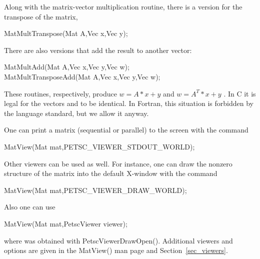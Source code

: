 Along with the matrix-vector multiplication routine, there is
a version for the transpose of the matrix,
\begin{tabbing}
  MatMultTranspose(Mat A,Vec x,Vec y);
\end{tabbing}
There are also versions that add the result
to another vector:
\begin{tabbing}
  MatMultAdd(Mat A,Vec x,Vec y,Vec w);\\
  MatMultTransposeAdd(Mat A,Vec x,Vec y,Vec w);
\end{tabbing}
These routines, respectively, produce $ w = A*x + y $ and $ w = A^{T}*x + y$ .
In C it is legal for the vectors  and  to be identical.
In Fortran, this situation is forbidden by the language standard,
but we allow it anyway.

One can print a matrix (sequential or parallel) to the screen with the
command
\begin{tabbing}
  MatView(Mat mat,PETSC\_VIEWER\_STDOUT\_WORLD);
\end{tabbing}
Other viewers can be used as well. For instance, one can draw the
nonzero structure of the matrix into the default X-window with the
command
\begin{tabbing}
  MatView(Mat mat,PETSC\_VIEWER\_DRAW\_WORLD);
\end{tabbing}
Also one can use
\begin{tabbing}
  MatView(Mat mat,PetscViewer viewer);
\end{tabbing}
where  was obtained with PetscViewerDrawOpen().
Additional viewers and options are given in the MatView() man
page and Section~\ref{sec_viewers}.

